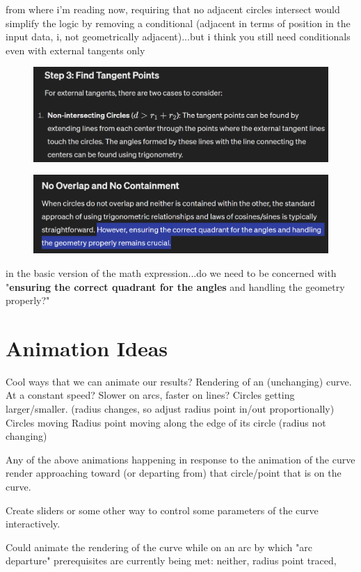 \documentclass[sigconf]{acmart}
\begin{document}
from where i'm reading now, requiring that no adjacent circles intersect would simplify the logic by removing a conditional
(adjacent in terms of position in the input data, i, not geometrically adjacent)...but i think you still need conditionals even with external tangents only

\begin{figure}
    \centering
    \includegraphics[width=0.5\linewidth]{Non-IntersectingCircles_FindTangentPoints.png}
    
    
\end{figure}
\begin{figure}
    \centering
    \includegraphics[width=0.5\linewidth]{NoOverlapNoContainment_FindTangents.png}
    
    
\end{figure}

in the basic version of the math expression...do we need to be concerned with "\textbf{ensuring the correct quadrant for the angles} and handling the geometry properly?"





\section{Animation Ideas}
Cool ways that we can animate our results?
Rendering of an (unchanging) curve. At a constant speed? Slower on arcs, faster on lines?
Circles getting larger/smaller. (radius changes, so adjust radius point in/out proportionally)
Circles moving
Radius point moving along the edge of its circle (radius not changing)

Any of the above animations happening in response to the animation of the curve render approaching toward (or departing from) that circle/point that is on the curve.

Create sliders or some other way to control some parameters of the curve interactively.

Could animate the rendering of the curve while on an arc by which "arc departure" prerequisites are currently being met: neither, radius point traced, 
\end{document}
